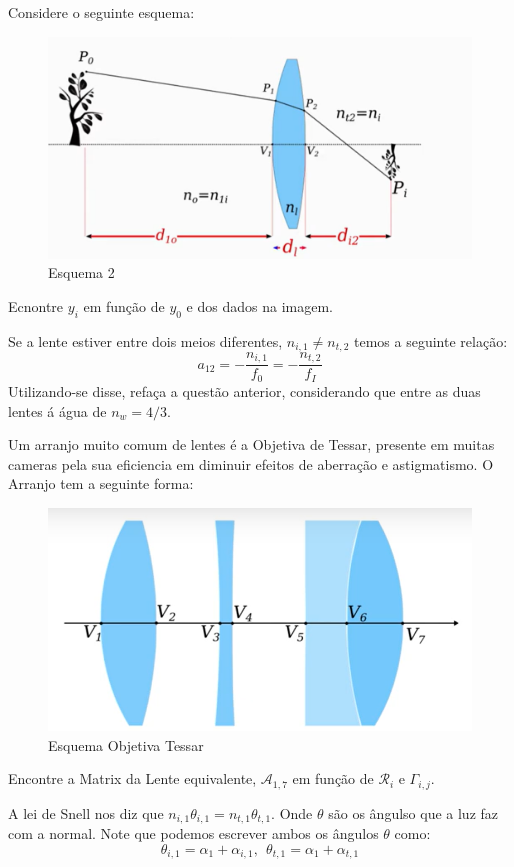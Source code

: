 \documentclass[11pt]{article}
\begin{document}
\begin{pproblem}
\begin{alternativas}
            \item Considere o seguinte esquema:
                \begin{figure}[H]
                    \centering
                    \includegraphics[width=0.9\linewidth]{imagens/lentes2.png}
                    \caption{Esquema 2}
                \end{figure}
                 Ecnontre \(y_i\) em função de \(y_0\) e dos dados na imagem.
                 
            \item Se a lente estiver entre dois meios diferentes, \(n_{i,1} \ne n_{t,2}\) temos a seguinte relação:
            \[a_{12} = -\frac{n_{i,1}}{f_0}=-\frac{n_{t,2}}{f_I}\]
                Utilizando-se disse, refaça a questão anterior, considerando que entre as duas lentes á água de \(n_w = 4/3\).
        
            \item Um arranjo muito comum de lentes é a Objetiva de Tessar, presente em muitas cameras pela sua eficiencia em diminuir efeitos de aberração e astigmatismo. O Arranjo tem a seguinte forma:
                \begin{figure}[H]
                    \centering
                    \includegraphics[width=0.7\linewidth]{imagens/lentes3.png}
                    \caption{Esquema Objetiva Tessar}
                \end{figure}
                Encontre a Matrix da Lente equivalente, \(\mathcal{A}_{1,7}\) em função de \(\mathcal{R}_i\) e \(\Gamma_{i,j}\).
        \end{alternativas}
    \begin{pssolution*}{}{}
        \begin{alternativas}
            \item A lei de Snell nos diz que \(n_{i,1}\theta_{i,1} = n_{t,1}\theta_{t,1}\). Onde \(\theta\) são os ângulso que a luz faz com a normal. Note que podemos escrever ambos os ângulos \(\theta\) como:
            \[\theta_{i,1} = \alpha_1 + \alpha_{i,1}, \ \ \theta _{t,1} = \alpha_1 + \alpha_{t,1}\]


\end{alternativas}
\end{pssolution*}
\end{pproblem}
\end{document}

